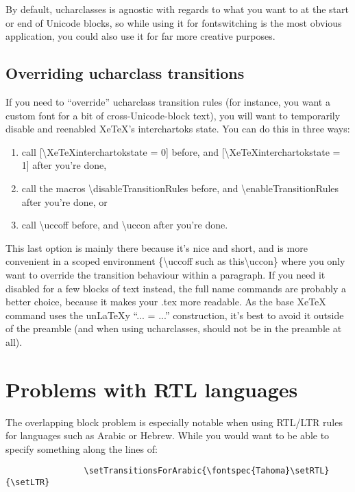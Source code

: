 ﻿\documentclass{article}
\newenvironment{numberlist}{%
  \begin{enumerate}
	\setlength{\itemsep}{0pt}
	\setlength{\parsep}{0pt}
	\setlength{\topsep}{0pt}
	\setlength{\partopsep}{0pt}
	\setlength{\parskip}{0pt}
	\setlength{\labelsep}{5pt}}%
{
  \end{enumerate}}
\begin{document}
		By default, ucharclasses is agnostic with regards to what you want to at the start or end of Unicode blocks, so while using it for fontswitching is the most obvious application, you could also use it for far more creative purposes.

		\subsection{Overriding ucharclass transitions}
		
			If you need to “override” ucharclass transition rules (for instance, you want a custom font for a bit of cross-Unicode-block text), you will want to temporarily disable and reenabled XeTeX's interchartoks state. You can do this in three ways:
			
			\begin{numberlist}
				\item call [\textbackslash XeTeXinterchartokstate = 0] before, and [\textbackslash XeTeXinterchartokstate = 1] after you're done,
				\item call the macros \textbackslash disableTransitionRules before, and \textbackslash enableTransitionRules after you're done, or
				\item call \textbackslash uccoff before, and \textbackslash uccon after you're done.
			\end{numberlist}
			
			This last option is mainly there because it's nice and short, and is more convenient in a scoped environment \{\textbackslash uccoff such as this\textbackslash uccon\} where you only want to override the transition behaviour within a paragraph. If you need it disabled for a few blocks of text instead, the full name commands are probably a better choice, because it makes your .tex more readable. As the base XeTeX command uses the un\LaTeX y “... = ...” construction, it's best to avoid it outside of the preamble (and when using ucharclasses, should not be in the preamble at all).

	\section{Problems with RTL languages}

		The overlapping block problem is especially notable when using RTL/LTR rules for languages such as Arabic or Hebrew. While you would want to be able to specify something along the lines of:
		
		\begin{verbatim}
				\setTransitionsForArabic{\fontspec{Tahoma}\setRTL}{\setLTR}
		\end{verbatim}
	
\end{document}
